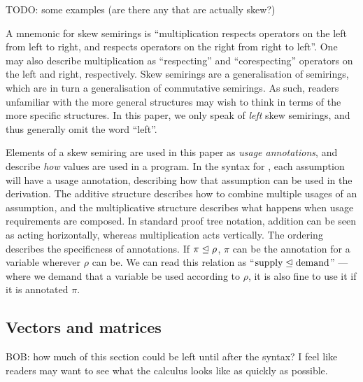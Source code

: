 \documentclass[submission,copyright,creativecommons]{eptcs}
\begin{document}
\begin{example}
  TODO: some examples (are there any that are actually skew?)
\end{example}

A mnemonic for skew semirings is ``multiplication respects operators on the left
from left to right, and respects operators on the right from right to left''.
One may also describe multiplication as ``respecting'' and ``corespecting''
operators on the left and right, respectively.
Skew semirings are a generalisation of semirings, which are in turn a
generalisation of commutative semirings.
As such, readers unfamiliar with the more general structures may wish to think
in terms of the more specific structures.
In this paper, we only speak of \emph{left} skew semirings, and thus generally
omit the word ``left''.

Elements of a skew semiring are used in this paper as \emph{usage annotations},
and describe \emph{how} values are used in a program.
In the syntax for \name{}, each assumption will have a usage annotation,
describing how that assumption can be used in the derivation.
The additive structure describes how to combine multiple usages of an
assumption, and the multiplicative structure describes what happens when usage
requirements are composed.
In standard proof tree notation, addition can be seen as acting horizontally,
whereas multiplication acts vertically.
The ordering describes the specificness of annotations.
If $\pi \trianglelefteq \rho$, $\pi$ can be the annotation for a variable wherever
$\rho$ can be.
We can read this relation as ``$\textrm{supply} \trianglelefteq \textrm{demand}$'' ---
where we demand that a variable be used according to $\rho$, it is also fine to
use it if it is annotated $\pi$.

\subsection{Vectors and matrices}

BOB: how much of this section could be left until after the syntax? I
feel like readers may want to see what the calculus looks like as
quickly as possible.
\end{document}
